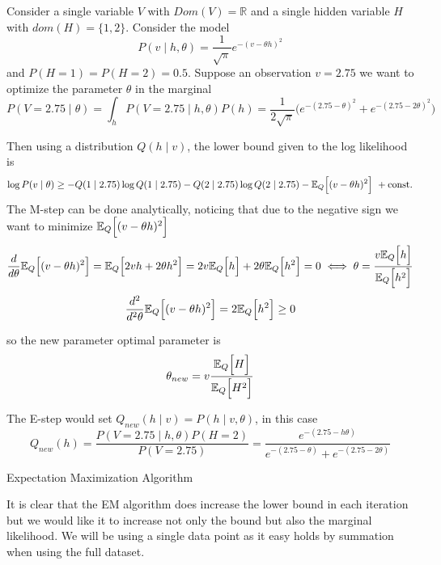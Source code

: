 \begin{exampleth}
  Consider a single variable \(V\) with \(Dom(V) = \mathbb{R}\) and a single hidden variable \(H\) with \(dom(H) = \{1,2\}\). Consider the model
  \[
    P(v \mid h, \theta) = \frac{1}{\sqrt{\pi}}e^{-(v - \theta h)^{2}}
  \]
  and \(P(H = 1) = P(H = 2) = 0.5\). Suppose an observation \(v = 2.75\) we want to optimize the parameter \(\theta\) in the marginal
  \[
    P(V = 2.75 \mid \theta) = \int_{h} P(V = 2.75 \mid h, \theta) P(h) = \frac{1}{2\sqrt{\pi}}\big( e^{-(2.75 - \theta)^{2}} + e^{-(2.75 - 2\theta)^{2}} \big)
  \]

  Then using a distribution \(Q(h \mid v)\), the lower bound given to the log likelihood is
  \[
    \log{P(v \mid \theta)} \geq -Q(1 \mid 2.75)\log{Q(1 \mid 2.75)} - Q(2 \mid 2.75)\log{Q(2 \mid 2.75)} - \mathbb{E}_{Q}\Big[(v - \theta h)^{2}\Big]\ + \text{const.}
  \]
  The M-step can be done analytically, noticing that due to the negative sign we want to minimize \(\mathbb{E}_{Q}\Big[(v - \theta h)^{2}\Big]\)
  \[
    \frac{d}{d\theta}\mathbb{E}_{Q}\Big[(v - \theta h)^{2}\Big] = \mathbb{E}_{Q}\Big[ 2 v h + 2\theta h^{2} \Big] = 2v\mathbb{E}_{Q}\Big[h\Big] + 2\theta \mathbb{E}_{Q}\Big[h^{2}\Big] = 0 \iff \theta = \frac{v\mathbb{E}_{Q}\Big[h\Big]}{\mathbb{E}_{Q}\Big[h^{2}\Big]}
  \]
  \[
     \frac{d^{2}}{d^{2}\theta}\mathbb{E}_{Q}\Big[(v - \theta h)^{2}\Big] = 2\mathbb{E}_{Q}\Big[h^{2}\Big] \geq 0
  \]

  so the new parameter optimal parameter is
  \[
    \theta_{new} = v \frac{\mathbb{E}_{Q}\Big[H\Big]}{\mathbb{E}_{Q}\Big[H^{2}\Big]}
  \]

  The E-step would set \(Q_{new}(h \mid v) = P(h \mid v , \theta)\), in this case
  \[
    Q_{new}(h) = \frac{P(V = 2.75 \mid h, \theta)P(H = 2)}{P(V = 2.75)} = \frac{e^{-(2.75-h\theta)}}{ e^{-(2.75-\theta)} + e^{-(2.75-2\theta)}  }
  \]
\end{exampleth}

 \begin{algorithm}[t]
  \SetAlgoLined
  \KwRet{\(\theta\)}\;
  \caption{Expectation Maximization Algorithm}
  \label{alg:pc1}
\end{algorithm}

It is clear that the EM algorithm does increase the lower bound in each iteration but we would like it to increase not only the bound but also the marginal likelihood. We will be using a single data point as it easy holds by summation when using the full dataset.

